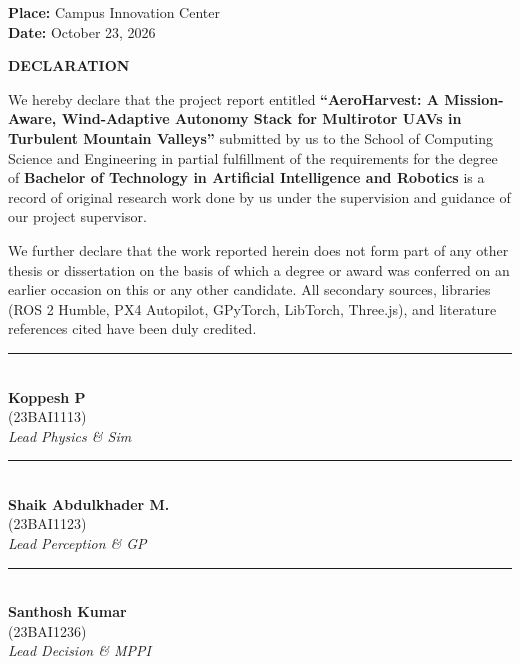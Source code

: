 \documentclass[12pt,a4paper,oneside]{report}
\begin{document}
\vspace{10mm}
\noindent
\textbf{Place:} Campus Innovation Center\\
\textbf{Date:} October 23, 2026

\newpage
\thispagestyle{plain}
\begin{center}
    \vspace*{5mm}
    {\LARGE \textbf{DECLARATION}}\\[8mm]
\end{center}

We hereby declare that the project report entitled \textbf{``AeroHarvest: A Mission-Aware, Wind-Adaptive Autonomy Stack for Multirotor UAVs in Turbulent Mountain Valleys''} submitted by us to the School of Computing Science and Engineering in partial fulfillment of the requirements for the degree of \textbf{Bachelor of Technology in Artificial Intelligence and Robotics} is a record of original research work done by us under the supervision and guidance of our project supervisor.

We further declare that the work reported herein does not form part of any other thesis or dissertation on the basis of which a degree or award was conferred on an earlier occasion on this or any other candidate. All secondary sources, libraries (ROS 2 Humble, PX4 Autopilot, GPyTorch, LibTorch, Three.js), and literature references cited have been duly credited.

\vspace{22mm}
\noindent
\begin{minipage}{0.32\textwidth}
    \centering
    \rule{0.9\textwidth}{0.5pt}\\
    \textbf{Koppesh P}\\
    (23BAI1113)\\
    \textit{Lead Physics \& Sim}
\end{minipage}
\hfill
\begin{minipage}{0.32\textwidth}
    \centering
    \rule{0.9\textwidth}{0.5pt}\\
    \textbf{Shaik Abdulkhader M.}\\
    (23BAI1123)\\
    \textit{Lead Perception \& GP}
\end{minipage}
\hfill
\begin{minipage}{0.32\textwidth}
    \centering
    \rule{0.9\textwidth}{0.5pt}\\
    \textbf{Santhosh Kumar}\\
    (23BAI1236)\\
    \textit{Lead Decision \& MPPI}
\end{minipage}
\end{document}
